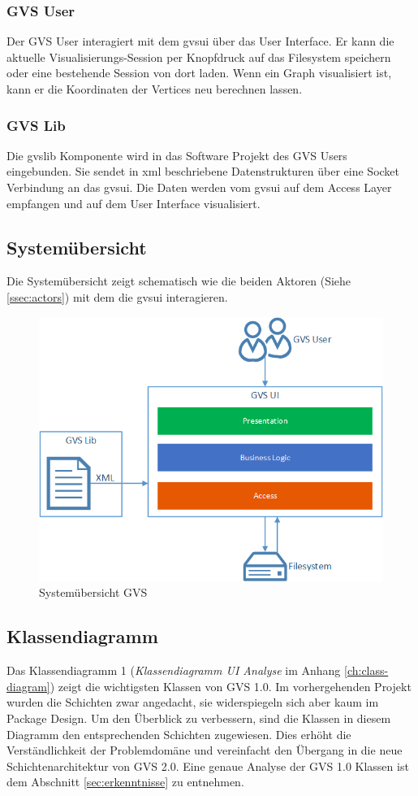 \documentclass[11pt,a4paper,english,oneside]{book}
\numberwithin{equation}{chapter}
\begin{document}
	\subsubsection{GVS User} \label{sssec:actor-user}
	Der GVS User interagiert mit dem \gls{gvsui} über das User Interface. Er kann die aktuelle Visualisierungs-Session per Knopfdruck auf das Filesystem speichern oder eine bestehende Session von dort laden. Wenn ein Graph visualisiert ist, kann er die Koordinaten der Vertices neu berechnen lassen.
	
	\subsubsection{GVS Lib} \label{sssec:actor-lib}
	Die \gls{gvslib} Komponente wird in das Software Projekt des GVS Users eingebunden. Sie sendet in \gls{xml} beschriebene Datenstrukturen über eine Socket Verbindung an das \gls{gvsui}. Die Daten werden vom \gls{gvsui} auf dem Access Layer empfangen und auf dem User Interface visualisiert.
	
	\subsection{Systemübersicht}
	Die Systemübersicht zeigt schematisch wie die beiden Aktoren (Siehe \ref{ssec:actors}) mit dem  die \gls{gvsui} interagieren.
	
	\begin{figure}[h!]
		\centering
		\includegraphics[width=0.5\linewidth]{assets/images/system_overview}
		\caption{Systemübersicht GVS}
		\label{fig:gvs-systemuebersicht}
	\end{figure}
	
	\subsection{Klassendiagramm} \label{ssec:klassendiagramm-1}
	Das Klassendiagramm 1 (\textit{Klassendiagramm UI Analyse} im Anhang \ref{ch:class-diagram}) zeigt die wichtigsten Klassen von GVS 1.0. Im vorhergehenden Projekt wurden die Schichten zwar angedacht, sie widerspiegeln sich aber kaum im Package Design. Um den Überblick zu verbessern, sind die Klassen in diesem Diagramm den entsprechenden Schichten zugewiesen. Dies erhöht die Verständlichkeit der Problemdomäne und vereinfacht den Übergang in die neue Schichtenarchitektur von GVS 2.0. Eine genaue Analyse der GVS 1.0 Klassen ist dem Abschnitt \ref{sec:erkenntnisse} zu entnehmen. 
		
\end{document}
